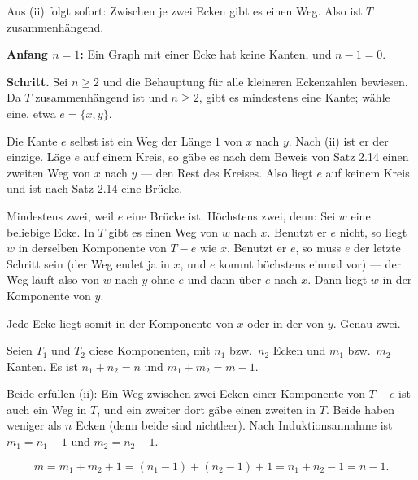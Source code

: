 \begin{merksatz}
Aus (ii) folgt sofort: Zwischen je zwei Ecken gibt es einen Weg. Also ist $T$ zusammenhängend.

\textbf{Anfang $n=1$:} Ein Graph mit einer Ecke hat keine Kanten, und $n - 1 = 0$. \checkmark

\textbf{Schritt.} Sei $n \ge 2$ und die Behauptung für alle kleineren Eckenzahlen bewiesen. Da $T$ zusammenhängend ist und $n \ge 2$, gibt es mindestens eine Kante; wähle eine, etwa $e = \{x,y\}$.

Die Kante $e$ selbst ist ein Weg der Länge $1$ von $x$ nach $y$. Nach (ii) ist er der einzige. Läge $e$ auf einem Kreis, so gäbe es nach dem Beweis von Satz 2.14 einen zweiten Weg von $x$ nach $y$ --- den Rest des Kreises. Also liegt $e$ auf keinem Kreis und ist nach Satz 2.14 eine Brücke.

Mindestens zwei, weil $e$ eine Brücke ist. Höchstens zwei, denn: Sei $w$ eine beliebige Ecke. In $T$ gibt es einen Weg von $w$ nach $x$. Benutzt er $e$ nicht, so liegt $w$ in derselben Komponente von $T-e$ wie $x$. Benutzt er $e$, so muss $e$ der letzte Schritt sein (der Weg endet ja in $x$, und $e$ kommt höchstens einmal vor) --- der Weg läuft also von $w$ nach $y$ ohne $e$ und dann über $e$ nach $x$. Dann liegt $w$ in der Komponente von $y$.

Jede Ecke liegt somit in der Komponente von $x$ oder in der von $y$. Genau zwei.

Seien $T_1$ und $T_2$ diese Komponenten, mit $n_1$ bzw.\ $n_2$ Ecken und $m_1$ bzw.\ $m_2$ Kanten. Es ist $n_1 + n_2 = n$ und $m_1 + m_2 = m - 1$.

Beide erfüllen (ii): Ein Weg zwischen zwei Ecken einer Komponente von $T-e$ ist auch ein Weg in $T$, und ein zweiter dort gäbe einen zweiten in $T$. Beide haben weniger als $n$ Ecken (denn beide sind nichtleer). Nach Induktionsannahme ist $m_1 = n_1 - 1$ und $m_2 = n_2 - 1$.

\[ m = m_1 + m_2 + 1 = (n_1 - 1) + (n_2 - 1) + 1 = n_1 + n_2 - 1 = n - 1 . \]
\end{merksatz}


